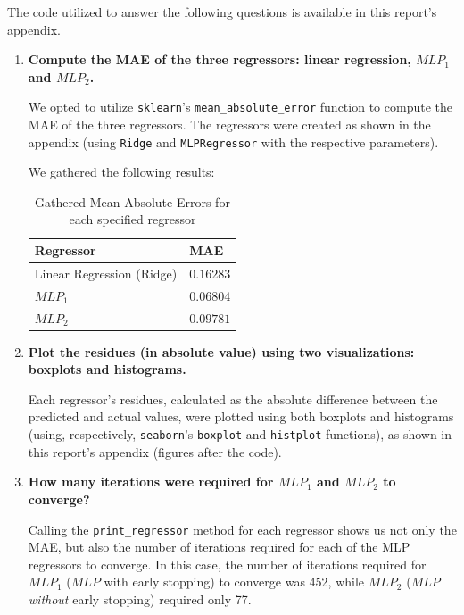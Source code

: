 \documentclass[12pt]{article}
\begin{document}
\begin{justify}
  The code utilized to answer the following questions is available in this
  report's appendix.
\end{justify}

\begin{enumerate}[leftmargin=\labelsep,resume]
  \item \textbf{Compute the MAE of the three regressors: linear regression, $MLP_1$ and $MLP_2$.}

        We opted to utilize \texttt{sklearn}'s \texttt{mean\_absolute\_error} function to compute the MAE of the three regressors.
        The regressors were created as shown in the appendix (using \texttt{Ridge} and
        \texttt{MLPRegressor} with the respective parameters).

        We gathered the following results:

        \begin{table}[h]
          \centering
          \begin{tabular}{l|l}
            Regressor                 & MAE       \\ \hline
            Linear Regression (Ridge) & $0.16283$ \\
            $MLP_1$                   & $0.06804$ \\
            $MLP_2$                   & $0.09781$
          \end{tabular}
          \caption{Gathered Mean Absolute Errors for each specified regressor}
          \label{tab:mean-absolute-errors}
        \end{table}

  \item \textbf{Plot the residues (in absolute value) using two visualizations: boxplots and histograms.}

        Each regressor's residues, calculated as the absolute difference between
        the predicted and actual values, were plotted using both boxplots and histograms
        (using, respectively, \texttt{seaborn}'s \texttt{boxplot} and \texttt{histplot} functions),
        as shown in this report's appendix (figures after the code).

  \item \textbf{How many iterations were required for $MLP_1$ and $MLP_2$ to converge?}

        Calling the \texttt{print\_regressor} method for each regressor shows us
        not only the MAE, but also the number of iterations required for each of
        the MLP regressors to converge. In this case, the number of iterations
        required for $MLP_1$ ($MLP$ with early stopping) to converge was 452,
        while $MLP_2$ ($MLP$ \textit{without} early stopping) required only 77.


\end{enumerate}
\end{document}
